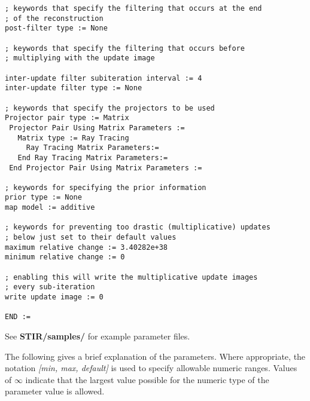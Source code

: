 \documentclass{article}
\begin{document}
\begin{verbatim}
; keywords that specify the filtering that occurs at the end
; of the reconstruction
post-filter type := None

; keywords that specify the filtering that occurs before 
; multiplying with the update image

inter-update filter subiteration interval := 4
inter-update filter type := None

; keywords that specify the projectors to be used
Projector pair type := Matrix 
 Projector Pair Using Matrix Parameters := 
   Matrix type := Ray Tracing
     Ray Tracing Matrix Parameters:=
   End Ray Tracing Matrix Parameters:= 
 End Projector Pair Using Matrix Parameters :=

; keywords for specifying the prior information
prior type := None
map model := additive

; keywords for preventing too drastic (multiplicative) updates
; below just set to their default values
maximum relative change := 3.40282e+38
minimum relative change := 0

; enabling this will write the multiplicative update images 
; every sub-iteration
write update image := 0

END :=
\end{verbatim}

See \textbf{STIR/samples/} for example parameter files.

The following gives a brief explanation of the parameters. Where 
appropriate, the notation \textit{[min, max, default]} is used to 
specify allowable numeric ranges. Values of \textit{\ensuremath{\infty}} indicate 
that the largest value possible for the numeric type of the parameter 
value is allowed.
\end{document}
